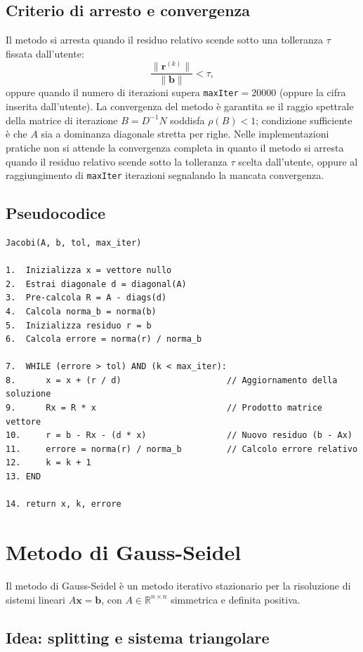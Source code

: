 \documentclass[a4paper, 12pt]{report}
\begin{document}
\subsection*{Criterio di arresto e convergenza}

Il metodo si arresta quando il residuo relativo scende sotto una
tolleranza $\tau$ fissata dall'utente:
\[
    \frac{\|\mathbf{r}^{(k)}\|}{\|\mathbf{b}\|} < \tau,
\]
oppure quando il numero di iterazioni supera \texttt{maxIter}$= 20000$ (oppure la cifra inserita dall'utente).
La convergenza del metodo è garantita se il raggio spettrale della
matrice di iterazione $B = D^{-1}N$ soddisfa $\rho(B) < 1$; condizione
sufficiente è che $A$ sia a dominanza diagonale stretta per righe.
Nelle implementazioni pratiche non si attende la convergenza completa in quanto
il metodo si arresta quando il residuo relativo scende sotto la
tolleranza $\tau$ scelta dall'utente, oppure al raggiungimento di
\texttt{maxIter} iterazioni segnalando la mancata convergenza.
\subsection*{Pseudocodice}
\begin{verbatim}
Jacobi(A, b, tol, max_iter)

1.  Inizializza x = vettore nullo
2.  Estrai diagonale d = diagonal(A)
3.  Pre-calcola R = A - diags(d)
4.  Calcola norma_b = norma(b)
5.  Inizializza residuo r = b
6.  Calcola errore = norma(r) / norma_b

7.  WHILE (errore > tol) AND (k < max_iter):
8.      x = x + (r / d)                     // Aggiornamento della soluzione
9.      Rx = R * x                          // Prodotto matrice vettore
10.     r = b - Rx - (d * x)                // Nuovo residuo (b - Ax)
11.     errore = norma(r) / norma_b         // Calcolo errore relativo
12.     k = k + 1
13. END

14. return x, k, errore
\end{verbatim}
\section{Metodo di Gauss-Seidel}

Il metodo di Gauss-Seidel è un metodo iterativo stazionario per la
risoluzione di sistemi lineari $A\mathbf{x} = \mathbf{b}$, con
$A \in \mathbb{R}^{n \times n}$ simmetrica e definita positiva.

\subsection*{Idea: splitting e sistema triangolare}
\end{document}
